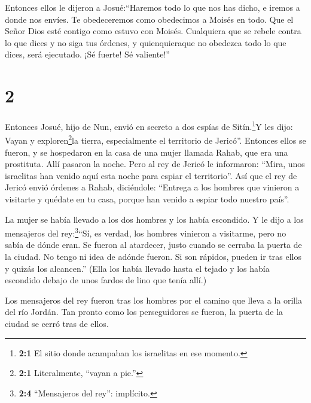  Entonces ellos le dijeron a Josué:``Haremos todo lo que
nos has dicho, e iremos a donde nos envíes.  Te
obedeceremos como obedecimos a Moisés en todo. Que el Señor Dios esté
contigo como estuvo con Moisés.  Cualquiera que se rebele
contra lo que dices y no siga tus órdenes, y quienquieraque no obedezca
todo lo que dices, será ejecutado. ¡Sé fuerte! Sé valiente!''

\hypertarget{section-1}{%
\section{2}\label{section-1}}

 Entonces Josué, hijo de Nun, envió en secreto a dos espías
de Sitín.\footnote{\textbf{2:1} El sitio donde acampaban los israelitas
  en ese momento.}Y les dijo: Vayan y exploren\footnote{\textbf{2:1}
  Literalmente, ``vayan a pie.''}la tierra, especialmente el territorio
de Jericó''. Entonces ellos se fueron, y se hospedaron en la casa de una
mujer llamada Rahab, que era una prostituta. Allí pasaron la noche.
 Pero al rey de Jericó le informaron: ``Mira, unos
israelitas han venido aquí esta noche para espiar el territorio''.
 Así que el rey de Jericó envió órdenes a Rahab, diciéndole:
``Entrega a los hombres que vinieron a visitarte y quédate en tu casa,
porque han venido a espiar todo nuestro país''.

 La mujer se había llevado a los dos hombres y los había
escondido. Y le dijo a los mensajeros del rey:\footnote{\textbf{2:4}
  ``Mensajeros del rey'': implícito.}``Sí, es verdad, los hombres
vinieron a visitarme, pero no sabía de dónde eran.  Se
fueron al atardecer, justo cuando se cerraba la puerta de la ciudad. No
tengo ni idea de adónde fueron. Si son rápidos, pueden ir tras ellos y
quizás los alcancen.''  (Ella los había llevado hasta el
tejado y los había escondido debajo de unos fardos de lino que tenía
allí.)

 Los mensajeros del rey fueron tras los hombres por el
camino que lleva a la orilla del río Jordán. Tan pronto como los
perseguidores se fueron, la puerta de la ciudad se cerró tras de ellos.

